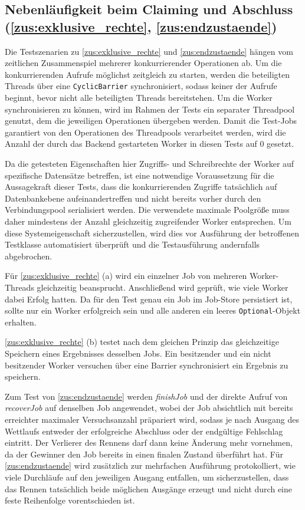 \subsection{Nebenläufigkeit beim Claiming und Abschluss (\ref{zus:exklusive_rechte}, \ref{zus:endzustaende})}
\label{subsec:nebenlaeufigkeits_fehlersimulation}
Die Testszenarien zu \ref{zus:exklusive_rechte} und \ref{zus:endzustaende} hängen vom zeitlichen Zusammenspiel mehrerer konkurrierender Operationen ab.
Um die konkurrierenden Aufrufe möglichst zeitgleich zu starten, werden die beteiligten Threads über eine \texttt{CyclicBarrier}
synchronisiert, sodass keiner der Aufrufe beginnt, bevor nicht alle beteiligten Threads bereitstehen.
Um die Worker synchronisieren zu können, wird im Rahmen der Tests ein separater Threadpool genutzt, dem die jeweiligen
Operationen übergeben werden.
Damit die Test-Jobs garantiert von den Operationen des Threadpools verarbeitet werden, wird die Anzahl der durch das Backend
gestarteten Worker in diesen Tests auf 0 gesetzt.

Da die getesteten Eigenschaften hier Zugriffs- und Schreibrechte der Worker auf spezifische Datensätze betreffen, ist
eine notwendige Voraussetzung für die Aussagekraft dieser Tests, dass die konkurrierenden Zugriffe tatsächlich auf
Datenbankebene aufeinandertreffen und nicht bereits vorher durch den Verbindungspool serialisiert werden.
Die verwendete maximale Poolgröße muss daher mindestens der Anzahl gleichzeitig zugreifender Worker entsprechen.
Um diese Systemeigenschaft sicherzustellen, wird dies vor Ausführung der betroffenen Testklasse automatisiert überprüft
und die Testausführung andernfalls abgebrochen.

Für \ref{zus:exklusive_rechte} (a) wird ein einzelner Job von mehreren Worker-Threads gleichzeitig beansprucht.
Anschließend wird geprüft, wie viele Worker dabei Erfolg hatten.
Da für den Test genau ein Job im Job-Store persistiert ist, sollte nur ein Worker erfolgreich sein und alle anderen
ein leeres \texttt{Optional}-Objekt erhalten.

\ref{zus:exklusive_rechte} (b) testet nach dem gleichen Prinzip das gleichzeitige Speichern eines Ergebnisses desselben Jobs.
Ein besitzender und ein nicht besitzender Worker versuchen über eine Barrier synchronisiert ein Ergebnis zu speichern.

Zum Test von \ref{zus:endzustaende} werden \textit{finishJob} und der direkte Aufruf von \textit{recoverJob} auf denselben
Job angewendet, wobei der Job absichtlich mit bereits erreichter maximaler Versuchsanzahl präpariert wird, sodass je nach
Ausgang des Wettlaufs entweder der erfolgreiche Abschluss oder der endgültige Fehlschlag eintritt.
Der Verlierer des Rennens darf dann keine Änderung mehr vornehmen, da der Gewinner den Job bereits in einen finalen
Zustand überführt hat.
Für \ref{zus:endzustaende} wird zusätzlich zur mehrfachen Ausführung protokolliert, wie viele Durchläufe auf den jeweiligen Ausgang entfallen,
um sicherzustellen, dass das Rennen tatsächlich beide möglichen Ausgänge erzeugt und nicht durch eine feste Reihenfolge vorentschieden ist.

